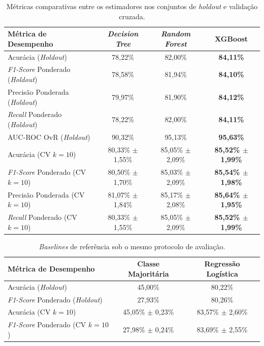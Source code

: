 \begin{table}[htb]
\centering
\caption{Métricas comparativas entre os estimadores nos conjuntos de \textit{holdout} e validação cruzada.}
\label{tab:resultados_comparativos}
\footnotesize
\setlength{\tabcolsep}{4pt}
\begin{tabular}{lccc}
\toprule
\textbf{Métrica de Desempenho} & \textbf{\textit{Decision Tree}} & \textbf{\textit{Random Forest}} & \textbf{XGBoost} \\
\midrule
Acurácia (\textit{Holdout}) & 78,22\% & 82,00\% & \textbf{84,11\%} \\
\textit{F1-Score} Ponderado (\textit{Holdout}) & 78,58\% & 81,94\% & \textbf{84,10\%} \\
Precisão Ponderada (\textit{Holdout}) & 79,97\% & 81,90\% & \textbf{84,12\%} \\
\textit{Recall} Ponderado (\textit{Holdout}) & 78,22\% & 82,00\% & \textbf{84,11\%} \\
AUC-ROC OvR (\textit{Holdout}) & 90,32\% & 95,13\% & \textbf{95,63\%} \\
\midrule
Acurácia (CV $k=10$) & 80,33\% $\pm$ 1,55\% & 85,05\% $\pm$ 2,09\% & \textbf{85,52\% $\pm$ 1,99\%} \\
\textit{F1-Score} Ponderado (CV $k=10$) & 80,50\% $\pm$ 1,70\% & 85,03\% $\pm$ 2,09\% & \textbf{85,54\% $\pm$ 1,98\%} \\
Precisão Ponderada (CV $k=10$) & 81,07\% $\pm$ 1,84\% & 85,17\% $\pm$ 2,08\% & \textbf{85,64\% $\pm$ 1,95\%} \\
\textit{Recall} Ponderado (CV $k=10$) & 80,33\% $\pm$ 1,55\% & 85,05\% $\pm$ 2,09\% & \textbf{85,52\% $\pm$ 1,99\%} \\
\bottomrule
\end{tabular}
\end{table}

\begin{table}[htb]
\centering
\caption{\textit{Baselines} de referência sob o mesmo protocolo de avaliação.}
\label{tab:baselines}
\begin{tabular}{lcc}
\toprule
\textbf{Métrica de Desempenho} & \textbf{Classe Majoritária} & \textbf{Regressão Logística} \\
\midrule
Acurácia (\textit{Holdout}) & 45,00\% & 80,22\% \\
\textit{F1-Score} Ponderado (\textit{Holdout}) & 27,93\% & 80,26\% \\
Acurácia (CV $k=10$) & 45,05\% $\pm$ 0,23\% & 83,57\% $\pm$ 2,60\% \\
\textit{F1-Score} Ponderado (CV $k=10$) & 27,98\% $\pm$ 0,24\% & 83,69\% $\pm$ 2,55\% \\
\bottomrule
\end{tabular}
\end{table}

